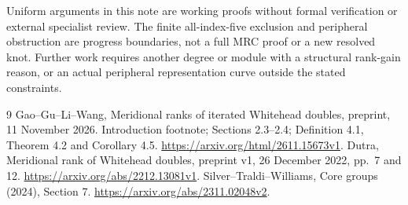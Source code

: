 \documentclass[11pt]{article}
\begin{document}
Uniform arguments in this note are working proofs without formal
verification or external specialist review. The finite all-index-five
exclusion and peripheral obstruction are progress boundaries, not
a full MRC proof or a new resolved knot. Further work requires
another degree or module with a structural rank-gain reason, or an
actual peripheral representation curve outside the stated constraints.

\clearpage
\begin{thebibliography}{9}
 Gao--Gu--Li--Wang, Meridional ranks of iterated
Whitehead doubles, preprint, 11 November 2026. Introduction footnote;
Sections 2.3--2.4; Definition 4.1, Theorem 4.2 and Corollary 4.5.
\url{https://arxiv.org/html/2611.15673v1}.
 Dutra, Meridional rank of Whitehead doubles,
preprint v1, 26 December 2022, pp.~7 and 12.
\url{https://arxiv.org/abs/2212.13081v1}.
 Silver--Traldi--Williams, Core groups (2024),
Section 7. \url{https://arxiv.org/abs/2311.02048v2}.
\end{thebibliography}
\end{document}
